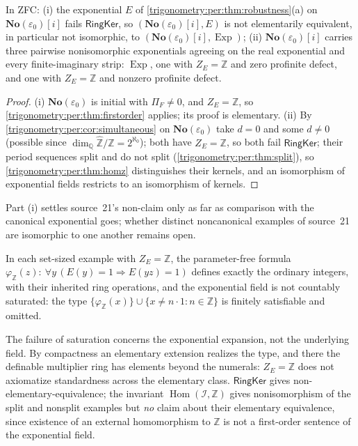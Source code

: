 \documentclass[11pt,letterpaper]{article}
\numberwithin{equation}{section}
\theoremstyle{definition}
\theoremstyle{remark}
\newcommand{\No}{\mathbf{No}}
\newcommand{\Q}{\mathbb Q}
\newcommand{\Z}{\mathbb Z}
\newcommand{\eps}{\varepsilon}
\newcommand{\Exp}{\operatorname{Exp}}
\newcommand{\Hom}{\operatorname{Hom}}
\newcommand{\Zhat}{\widehat{\Z}}
\newcommand{\cI}{\mathcal I}
\begin{document}
\begin{corollary}\label{trigonometry:per:cor:combined}
In ZFC: (i) the exponential $E$ of \cref{trigonometry:per:thm:robustness}(a) on $\No(\eps_0)[i]$ fails
$\mathsf{RingKer}$, so $(\No(\eps_0)[i],E)$ is not elementarily equivalent, in particular not
isomorphic, to $(\No(\eps_0)[i],\Exp)$; (ii) $\No(\eps_0)[i]$ carries three pairwise nonisomorphic
exponentials agreeing on the real exponential and every finite-imaginary strip: $\Exp$, one with $Z_E=\Z$
and zero profinite defect, and one with $Z_E=\Z$ and nonzero profinite defect.
\end{corollary}
\begin{proof}
(i) $\No(\eps_0)$ is initial with $\Pi_F\ne0$, and $Z_E=\Z$, so \cref{trigonometry:per:thm:firstorder}
applies; its proof is elementary. (ii) By \cref{trigonometry:per:cor:simultaneous} on $\No(\eps_0)$ take
$d=0$ and some $d\ne0$ (possible since $\dim_{\Q}\Zhat/\Z=2^{\aleph_0}$); both have $Z_E=\Z$, so both
fail $\mathsf{RingKer}$; their period sequences split and do not split
(\cref{trigonometry:per:thm:split}), so \cref{trigonometry:per:thm:homz} distinguishes their kernels, and
an isomorphism of exponential fields restricts to an isomorphism of kernels.
\end{proof}
Part (i) settles source~21's non-claim only as far as comparison with the canonical exponential goes;
whether distinct noncanonical examples of source~21 are isomorphic to one another remains open.

\begin{corollary}\label{trigonometry:per:cor:definable}
In each set-sized example with $Z_E=\Z$, the parameter-free formula
$\varphi_{\Z}(z):\ \forall y\,(E(y)=1\Rightarrow E(yz)=1)$ defines exactly the ordinary integers, with
their inherited ring operations, and the exponential field is not countably saturated: the type
$\{\varphi_{\Z}(x)\}\cup\{x\ne n\cdot1:n\in\Z\}$ is finitely satisfiable and omitted.
\end{corollary}
The failure of saturation concerns the exponential expansion, not the underlying field. By compactness
an elementary extension realizes the type, and there the definable multiplier ring has elements beyond
the numerals: $Z_E=\Z$ does not axiomatize standardness across the elementary class. $\mathsf{RingKer}$
gives non-elementary-equivalence; the invariant $\Hom(\cI,\Z)$ gives nonisomorphism of the split and
nonsplit examples but \emph{no} claim about their elementary equivalence, since existence of an
external homomorphism to $\Z$ is not a first-order sentence of the exponential field.
\end{document}
